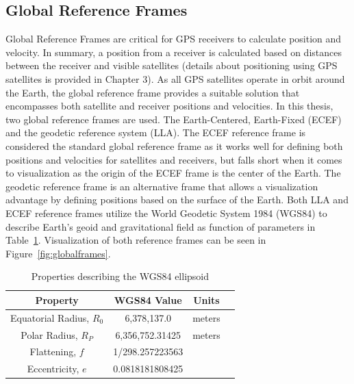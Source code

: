 \subsection{\textbf{Global Reference Frames}}
Global Reference Frames are critical for GPS receivers to calculate position and velocity. In summary, a position from a receiver is calculated based on distances between the receiver and visible satellites (details about positioning using GPS satellites is provided in Chapter 3). As all GPS satellites operate in orbit around the Earth, the global reference frame provides a suitable solution that encompasses both satellite and receiver positions and velocities. In this thesis, two global reference frames are used. The Earth-Centered, Earth-Fixed (ECEF) and the geodetic reference system (LLA). The ECEF reference frame is considered the standard global reference frame as it works well for defining both positions and velocities for satellites and receivers, but falls short when it comes to visualization as the origin of the ECEF frame is the center of the Earth. The geodetic reference frame is an alternative frame that allows a visualization advantage by defining positions based on the surface of the Earth. Both LLA and ECEF reference frames utilize the World Geodetic System 1984 (WGS84) to describe Earth's geoid and gravitational field as function of parameters in Table~\ref{tbl:wgs84}. Visualization of both reference frames can be seen in Figure~\ref{fig:globalframes}.

\begin{table}[!ht]
    \caption{Properties describing the WGS84 ellipsoid}\label{tbl:wgs84}
    \centering
    \begin{tabular}{cccc}
        \toprule
        \textbf{Property}          & \textbf{WGS84 Value} & \textbf{Units} \\
        \midrule
        Equatorial Radius, \(R_0\) & 6,378,137.0          & meters         \\
        Polar Radius, \(R_P\)      & 6,356,752.31425      & meters         \\
        Flattening, \(f\)          & 1/298.257223563      &                \\
        Eccentricity, \(e\)        & 0.0818181808425      &                \\
        \bottomrule
    \end{tabular}
\end{table}

